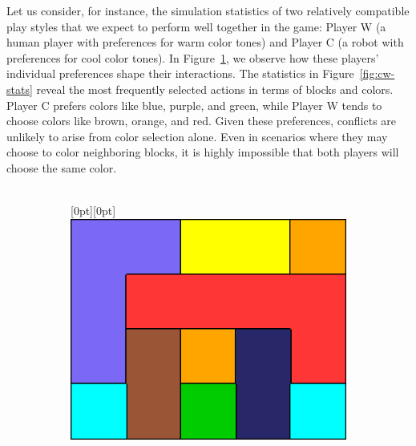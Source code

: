 \begin{flushleft}
\begin{flushleft}
        Let us consider, for instance, the simulation statistics of two relatively compatible play styles that we expect to perform well together in the game: Player W (a human player with preferences for warm color tones) and Player C (a robot with preferences for cool color tones). In Figure~\ref{fig:cw-solution}, we observe how these players' individual preferences shape their interactions. The statistics in Figure~\ref{fig:cw-stats} reveal the most frequently selected actions in terms of blocks and colors. Player C prefers colors like blue, purple, and green, while Player W tends to choose colors like brown, orange, and red. Given these preferences, conflicts are unlikely to arise from color selection alone. Even in scenarios where they may choose to color neighboring blocks, it is highly impossible that both players will choose the same color.\\~\\
        \begin{figure}[H]
            \centering
            \begin{subfigure}[b]{0.45\textwidth}
                \centering
                \raisebox{0.8cm}[0pt][0pt]{\includegraphics[width=\textwidth]{images/cw-solution.png}}
                \caption{}
                \label{fig:cw-solution}
            \end{subfigure}
            \hspace{0.05\textwidth}
            \begin{subfigure}[b]{0.45\textwidth}
                \centering

\end{subfigure}
\end{figure}
\end{flushleft}
\end{flushleft}
